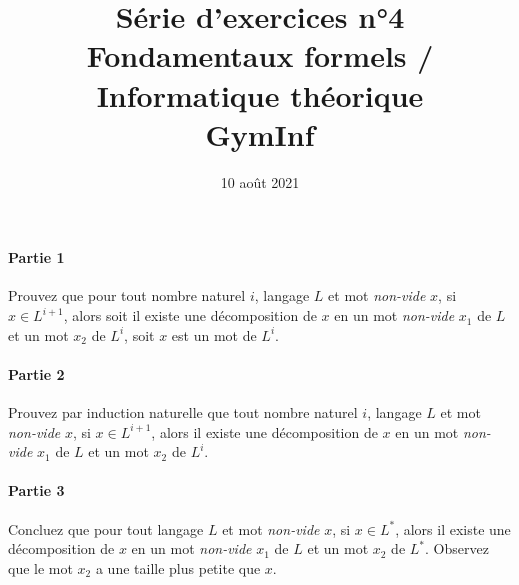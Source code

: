 \documentclass[12pt,french,a4paper]{article}
\begin{document}
\title{\vspace{-2cm}Série d'exercices n°4\\\large{Fondamentaux formels / Informatique théorique\\GymInf}}
\date{\vspace{-1cm}10 août 2021}

\maketitle

\begin{question}

\paragraph{Partie 1}
Prouvez que pour tout nombre naturel $i$, langage $L$ et mot \textit{non-vide} $x$,
si $x \in L^{i + 1}$, alors soit il existe une décomposition de $x$ en un mot \textit{non-vide} $x_1$ de $L$ et un mot $x_2$ de $L^i$, soit $x$ est un mot de $L^i$.

\paragraph{Partie 2}
Prouvez par induction naturelle que tout nombre naturel $i$, langage $L$ et mot \textit{non-vide} $x$,
si $x \in L^{i + 1}$, alors il existe une décomposition de $x$ en un mot \textit{non-vide} $x_1$ de $L$ et un mot $x_2$ de $L^i$.

\paragraph{Partie 3}
Concluez que pour tout langage $L$ et mot \textit{non-vide} $x$,
si $x \in L^*$, alors il existe une décomposition de $x$ en un mot \textit{non-vide} $x_1$ de $L$ et un mot $x_2$ de $L^*$.
Observez que le mot $x_2$ a une taille plus petite que $x$.
\end{question}
\end{document}
